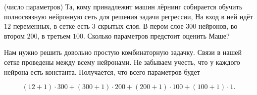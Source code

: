 \begin{problem}{(число параметров)}
Та, кому принадлежит машин лёрнинг собирается обучить полносвязную нейронную сеть для решения задачи регрессии, На вход в ней идёт $12$ переменных, в сетке есть $3$ скрытых слоя. В пером слое $300$ нейронов, во втором $200$, в третьем $100$.  Сколько параметров предстоит оценить Маше?
\end{problem}

\begin{sol} 
Нам нужно решить довольно простую комбинаторную задачку. Связи в нашей сетке проведены между всему нейронами. Не забываем учесть, что у каждого нейрона есть константа. Получается, что всего параметров будет

\[
(12 + 1) \cdot 300 + (300 + 1) \cdot 200 + (200 + 1) \cdot 100 + (100 + 1) \cdot 1.
\]

\end{sol} 
